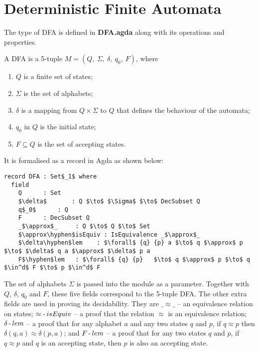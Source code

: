 \section{Deterministic Finite Automata}
\par The type of DFA is defined in \textbf{DFA.agda} along with its
operations and properties. 

\begin{defn}
\noindent A DFA is a 5-tuple \(M = (Q
,\ \Sigma,\ \delta,\ q_0,\ F)\), where
\begin{enumerate}[nolistsep]
  \item \(Q\) is a finite set of states;
  \item \(\Sigma\) is the set of alphabets;
  \item \(\delta\) is a mapping from \(Q \times \Sigma\) to \(Q\) that defines the behaviour of the automata;
  \item \(q_0\) in \(Q\) is the initial state;
  \item \(F \subseteq Q\) is the set of accepting states. 
\end{enumerate}
\end{defn}

\par It is formalised as a record in Agda as shown below: 

\begin{lstlisting}[mathescape=true,xleftmargin=.3\textwidth]
record DFA : Set$_1$ where
  field
    Q      : Set
    $\delta$       : Q $\to$ $\Sigma$ $\to$ DecSubset Q
    q$_0$      : Q
    F      : DecSubset Q
    _$\approx$_     : Q $\to$ Q $\to$ Set
    $\approx\hyphen$isEquiv : IsEquivalence _$\approx$_
    $\delta\hyphen$lem    : $\forall$ {q} {p} a $\to$ q $\approx$ p $\to$ $\delta$ q a $\approx$ $\delta$ p a
    F$\hyphen$lem   : $\forall$ {q} {p}   $\to$ q $\approx$ p $\to$ q $\in^d$ F $\to$ p $\in^d$ F
\end{lstlisting}

\par The set of alphabets \(\Sigma\) is passed into the module as a
parameter. Together with \(Q\), \(\delta\),
\(q_0\) and \(F\), these five fields correspond to the 5-tuple
DFA. The other extra fields are used in proving its decidability. They
are \(\_\approx\_\) -- an equivalence relation on states;
\(\approx\operatorname{-} isEquiv\) -- a proof that the relation \(\approx\) is
an equivalence relation; \(\delta\operatorname{-} lem\) -- a proof that for any
alphabet \(a\) and any two states \(q\) and \(p\), if \(q \approx p\)
then \(\delta (q,a) \approx \delta (p,a)\); and \(F\operatorname{-} lem\) -- a
proof that for any two states \(q\) and \(p\), if \(q \approx p\) and
\(q\) is an accepting state, then \(p\) is also an accepting state. 

